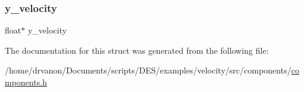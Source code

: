 \subsubsection{\texorpdfstring{y\+\_\+velocity}{y\_velocity}}
{\footnotesize\ttfamily float$\ast$ y\+\_\+velocity}



The documentation for this struct was generated from the following file\+:\begin{DoxyCompactItemize}
\item 
/home/drvanon/\+Documents/scripts/\+D\+E\+S/examples/velocity/src/components/\mbox{\hyperlink{components_8h}{components.\+h}}\end{DoxyCompactItemize}

